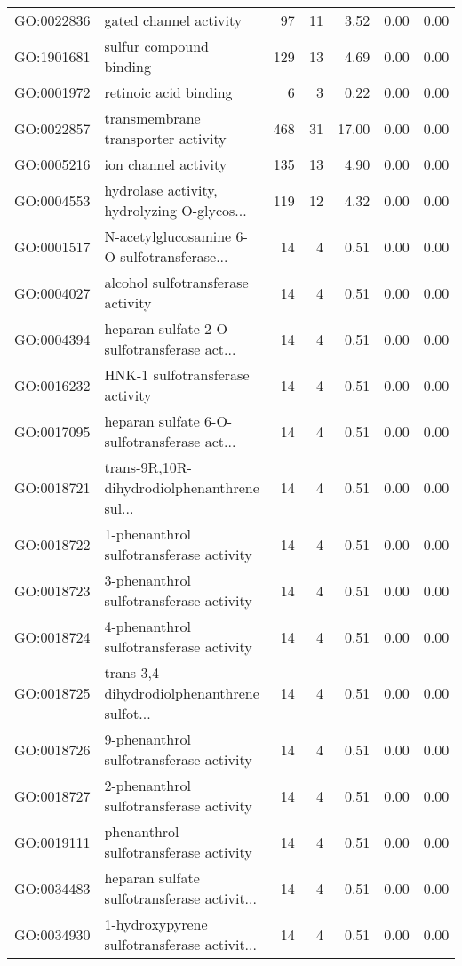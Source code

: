 \begin{table}[ht]
\begin{tabular}{llrrrrr}
  GO:0022836 & gated channel activity &  97 &  11 & 3.52 & 0.00 & 0.00 \\ 
  GO:1901681 & sulfur compound binding & 129 &  13 & 4.69 & 0.00 & 0.00 \\ 
  GO:0001972 & retinoic acid binding &   6 &   3 & 0.22 & 0.00 & 0.00 \\ 
  GO:0022857 & transmembrane transporter activity & 468 &  31 & 17.00 & 0.00 & 0.00 \\ 
  GO:0005216 & ion channel activity & 135 &  13 & 4.90 & 0.00 & 0.00 \\ 
  GO:0004553 & hydrolase activity, hydrolyzing O-glycos... & 119 &  12 & 4.32 & 0.00 & 0.00 \\ 
  GO:0001517 & N-acetylglucosamine 6-O-sulfotransferase... &  14 &   4 & 0.51 & 0.00 & 0.00 \\ 
  GO:0004027 & alcohol sulfotransferase activity &  14 &   4 & 0.51 & 0.00 & 0.00 \\ 
  GO:0004394 & heparan sulfate 2-O-sulfotransferase act... &  14 &   4 & 0.51 & 0.00 & 0.00 \\ 
  GO:0016232 & HNK-1 sulfotransferase activity &  14 &   4 & 0.51 & 0.00 & 0.00 \\ 
  GO:0017095 & heparan sulfate 6-O-sulfotransferase act... &  14 &   4 & 0.51 & 0.00 & 0.00 \\ 
  GO:0018721 & trans-9R,10R-dihydrodiolphenanthrene sul... &  14 &   4 & 0.51 & 0.00 & 0.00 \\ 
  GO:0018722 & 1-phenanthrol sulfotransferase activity &  14 &   4 & 0.51 & 0.00 & 0.00 \\ 
  GO:0018723 & 3-phenanthrol sulfotransferase activity &  14 &   4 & 0.51 & 0.00 & 0.00 \\ 
  GO:0018724 & 4-phenanthrol sulfotransferase activity &  14 &   4 & 0.51 & 0.00 & 0.00 \\ 
  GO:0018725 & trans-3,4-dihydrodiolphenanthrene sulfot... &  14 &   4 & 0.51 & 0.00 & 0.00 \\ 
  GO:0018726 & 9-phenanthrol sulfotransferase activity &  14 &   4 & 0.51 & 0.00 & 0.00 \\ 
  GO:0018727 & 2-phenanthrol sulfotransferase activity &  14 &   4 & 0.51 & 0.00 & 0.00 \\ 
  GO:0019111 & phenanthrol sulfotransferase activity &  14 &   4 & 0.51 & 0.00 & 0.00 \\ 
  GO:0034483 & heparan sulfate sulfotransferase activit... &  14 &   4 & 0.51 & 0.00 & 0.00 \\ 
  GO:0034930 & 1-hydroxypyrene sulfotransferase activit... &  14 &   4 & 0.51 & 0.00 & 0.00 \\ 

\end{tabular}
\end{table}
